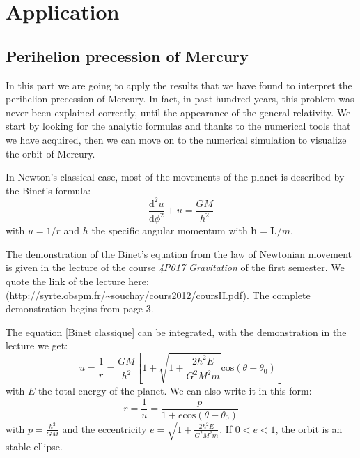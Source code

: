 \section{Application}

\subsection{Perihelion precession of Mercury}

In this part we are going to apply the results that we have found to interpret the
perihelion precession of Mercury. In fact, in past hundred years, this problem
was never been explained correctly, until the appearance of the general relativity.
We start by looking for the analytic formulas and thanks to the numerical tools that we
have acquired, then we can move on to the numerical simulation to visualize the orbit of Mercury.

In Newton's classical case, most of the movements of the planet is described by the
Binet's formula:
%
\begin{equation}\label{Binet classique}
	\frac{\mathrm{d}^2u}{\mathrm{d}\phi^2}+u=\frac{GM}{h^2}
\end{equation}
%
with $u=1/r$ and $h$ the specific angular momentum with $\textbf{h}=\textbf{L}/m$.

The demonstration of the Binet's equation from the law of Newtonian movement is given in
the lecture of the course \textit{4P017 Gravitation} of the first semester. We quote the
link of the lecture here: (\url{http://syrte.obspm.fr/~souchay/cours2012/coursII.pdf}). The
complete demonstration begins from page 3.

The equation \eqref{Binet classique} can be integrated, with the demonstration in the
lecture we get:
\begin{equation}\label{orbit classique}
	u=\frac{1}{r}=\frac{GM}{h^2}\left[ 1+\sqrt{1+\frac{2h^2E}{G^2M^2m}}
	\mathrm{cos}\left( \theta-\theta_0\right)\right]
\end{equation}
%
with $E$ the total energy of the planet. We can also write it in this form:
%
\begin{equation}
	r=\frac{1}{u}=\frac{p}{1+e\mathrm{cos}\left( \theta-\theta_0\right) }
\end{equation}
%
with $p=\frac{h^2}{GM}$ and the eccentricity $e=\sqrt{1+\frac{2h^2E}{G^2M^2m}}$.
If $0<e<1$, the orbit is an stable ellipse.

